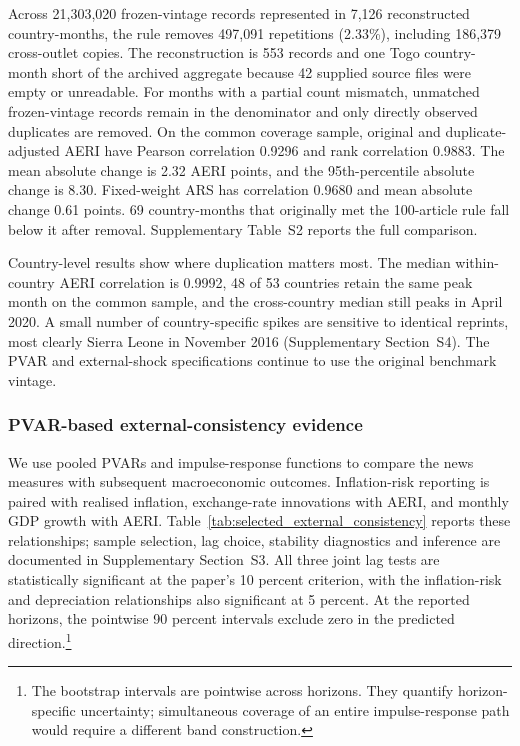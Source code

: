 \documentclass[12pt]{article}
\begin{document}
Across 21,303,020 frozen-vintage records represented in 7,126 reconstructed country-months, the rule removes 497,091 repetitions (2.33\%), including 186,379 cross-outlet copies. The reconstruction is 553 records and one Togo country-month short of the archived aggregate because 42 supplied source files were empty or unreadable. For months with a partial count mismatch, unmatched frozen-vintage records remain in the denominator and only directly observed duplicates are removed. On the common coverage sample, original and duplicate-adjusted AERI have Pearson correlation 0.9296 and rank correlation 0.9883. The mean absolute change is 2.32 AERI points, and the 95th-percentile absolute change is 8.30. Fixed-weight ARS has correlation 0.9680 and mean absolute change 0.61 points. 69 country-months that originally met the 100-article rule fall below it after removal. Supplementary Table~S2 reports the full comparison.


Country-level results show where duplication matters most. The median within-country AERI correlation is 0.9992, 48 of 53 countries retain the same peak month on the common sample, and the cross-country median still peaks in April 2020. A small number of country-specific spikes are sensitive to identical reprints, most clearly Sierra Leone in November 2016 (Supplementary Section~S4). The PVAR and external-shock specifications continue to use the original benchmark vintage.

\subsubsection{PVAR-based external-consistency evidence}
We use pooled PVARs and impulse-response functions to compare the news measures with subsequent macroeconomic outcomes. Inflation-risk reporting is paired with realised inflation, exchange-rate innovations with AERI, and monthly GDP growth with AERI. Table~\ref{tab:selected_external_consistency} reports these relationships; sample selection, lag choice, stability diagnostics and inference are documented in Supplementary Section~S3. All three joint lag tests are statistically significant at the paper's 10 percent criterion, with the inflation-risk and depreciation relationships also significant at 5 percent. At the reported horizons, the pointwise 90 percent intervals exclude zero in the predicted direction.\footnote{The bootstrap intervals are pointwise across horizons. They quantify horizon-specific uncertainty; simultaneous coverage of an entire impulse-response path would require a different band construction.}

\end{document}
